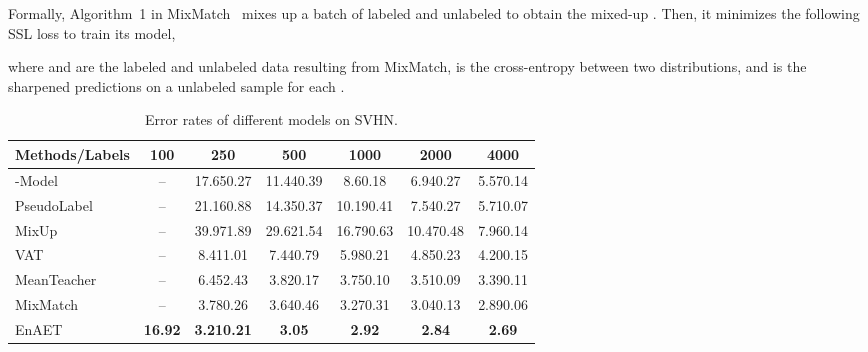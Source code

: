 \documentclass[journal]{IEEEtran}
\begin{document}
Formally, Algorithm~1 in MixMatch~\cite{berthelot2019mixmatch} mixes up a batch of labeled  and unlabeled  to obtain the mixed-up . Then, it minimizes the following SSL loss  to train its model,

where  and  are the labeled and unlabeled data resulting from MixMatch,  is the cross-entropy between two distributions, and  is the sharpened predictions on a unlabeled sample  for each .
\begin{table*}[!htb]
\centering
\caption{Error rates of different models on SVHN.}
\label{tab:svhn}
\begin{tabular}{lcccccc}
\toprule
Methods/Labels & 100 & 250 & 500 & 1000 & 2000 & 4000 \\ \midrule
-Model \cite{laine2016temporal,sajjadi2016regularization}& -- & 17.650.27 & 11.440.39 & 8.60.18 & 6.940.27 & 5.570.14 \\
 PseudoLabel \cite{lee2013pseudo}& -- & 21.160.88 & 14.350.37 & 10.190.41 & 7.540.27 & 5.710.07 \\
MixUp \cite{zhang2017mixup}& -- & 39.971.89 & 29.621.54 & 16.790.63 & 10.470.48 & 7.960.14 \\
 VAT \cite{miyato2018virtual}& -- & 8.411.01 & 7.440.79 & 5.980.21 & 4.850.23 & 4.200.15 \\
 MeanTeacher \cite{tarvainen2017mean}& -- & 6.452.43 & 3.820.17 & 3.750.10 & 3.510.09 & 3.390.11 \\
 MixMatch \cite{berthelot2019mixmatch}& -- & 3.780.26 & 3.640.46 & 3.270.31 & 3.040.13 & 2.890.06 \\\midrule
EnAET & \textbf{16.92} & \textbf{3.210.21} & \textbf{3.05} & \textbf{2.92} & \textbf{2.84} & \textbf{2.69} \\ \bottomrule
\end{tabular}
\end{table*}
\end{document}
